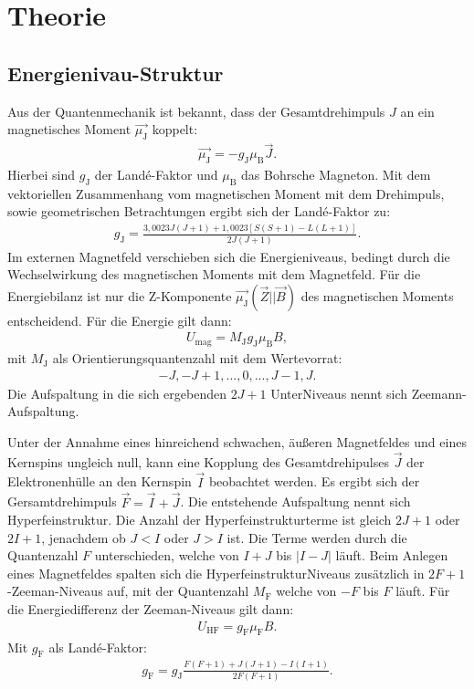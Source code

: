 \section{Theorie}
\label{sec:Theorie}
\subsection{Energienivau-Struktur}
Aus der Quantenmechanik ist bekannt, dass der Gesamtdrehimpuls $J$ an ein magnetisches Moment $\vec{\mu_\mathrm{J}}$
koppelt:
\begin{align}
  \vec{\mu_\mathrm{J}}=-g_\mathrm{J}\mu_\mathrm{B}\vec{J}.
\end{align}
Hierbei sind $g_\mathrm{J}$ der Landé-Faktor und $\mu_\mathrm{B}$ das Bohrsche Magneton.
Mit dem vektoriellen Zusammenhang vom magnetischen Moment mit dem Drehimpuls, sowie
geometrischen Betrachtungen ergibt sich der Landé-Faktor zu:
\begin{align}
  g_\mathrm{J}=\frac{3,0023J(J+1)+1,0023[S(S+1)-L(L+1)]}{2J(J+1)}.
\end{align}
Im externen Magnetfeld verschieben sich die Energieniveaus, bedingt durch  die Wechselwirkung des magnetischen
Moments mit dem Magnetfeld. Für die Energiebilanz ist nur die Z-Komponente $\vec{\mu_\mathrm{J}}(\vec{Z}||\vec{B})$ des magnetischen Moments
entscheidend.
Für die Energie gilt dann:
\begin{align}
  U_\mathrm{mag}=M_\mathrm{J}g_\mathrm{J}\mu_\mathrm{B}B,
\end{align}
mit $M_\mathrm{J}$ als Orientierungsquantenzahl mit dem Wertevorrat:
\begin{align}
  -J,-J+1,...,0,...,J-1,J.
\end{align}
Die Aufspaltung in die sich ergebenden $2J+1$ UnterNiveaus nennt sich Zeemann-Aufspaltung.

Unter der Annahme eines hinreichend schwachen, äußeren Magnetfeldes und eines Kernspins ungleich null, kann eine Kopplung des Gesamtdrehipulses $\vec{J}$ der
Elektronenhülle an den Kernspin $\vec{I}$ beobachtet werden. Es ergibt sich der Gersamtdrehimpuls $\vec{F}=\vec{I}+\vec{J}$.
Die entstehende Aufspaltung nennt sich Hyperfeinstruktur.
Die Anzahl der Hyperfeinstrukturterme ist gleich $2J+1$ oder $2I+1$, jenachdem ob $J<I$ oder $J>I$ ist.
Die Terme werden durch die Quantenzahl $F$ unterschieden, welche von $I+J$ bis $|I-J|$ läuft.
Beim Anlegen eines Magnetfeldes spalten sich die HyperfeinstrukturNiveaus zusätzlich in $2F+1$-Zeeman-Niveaus auf, mit der Quantenzahl $M_\mathrm{F}$
welche von $-F$ bis $F$ läuft.
Für die Energiedifferenz der Zeeman-Niveaus gilt dann:
\begin{align}
  U_\mathrm{HF}=g_\mathrm{F}\mu_\mathrm{F}B.
\end{align}
Mit $g_\mathrm{F}$ als Landé-Faktor:
\begin{align}
  g_\mathrm{F}=g_\mathrm{J}\frac{F(F+1)+J(J+1)-I(I+1)}{2F(F+1)}.\label{eqn:JI}
\end{align}

